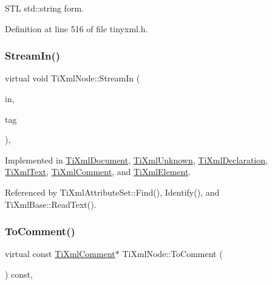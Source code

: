 S\+TL std\+::string form. 



Definition at line 516 of file tinyxml.\+h.

\hypertarget{class_ti_xml_node_ab4b4af1a6b486dcbc0e327cf291270af}{}\label{class_ti_xml_node_ab4b4af1a6b486dcbc0e327cf291270af} 
\subsubsection{\texorpdfstring{Stream\+In()}{StreamIn()}}
{\footnotesize\ttfamily virtual void Ti\+Xml\+Node\+::\+Stream\+In (\begin{DoxyParamCaption}\item[{std\+::istream $\ast$}]{in,  }\item[{\hyperlink{tinyxml_8h_a92bada05fd84d9a0c9a5bbe53de26887}{T\+I\+X\+M\+L\+\_\+\+S\+T\+R\+I\+NG} $\ast$}]{tag }\end{DoxyParamCaption})\hspace{0.3cm}{\ttfamily [protected]}, {}}



Implemented in \hyperlink{class_ti_xml_document_ab6d70b2c19e46aedb9903b3c3aa2a568}{Ti\+Xml\+Document}, \hyperlink{class_ti_xml_unknown_ad3f8fcc1efe364ddd8f43ef9a1046300}{Ti\+Xml\+Unknown}, \hyperlink{class_ti_xml_declaration_a72e455200e6b6e265e76bdec4417bb73}{Ti\+Xml\+Declaration}, \hyperlink{class_ti_xml_text_ab0ad9f14fd41689ced26f21a5c8919b4}{Ti\+Xml\+Text}, \hyperlink{class_ti_xml_comment_ad69c1024082f716462b6fd4b94488320}{Ti\+Xml\+Comment}, and \hyperlink{class_ti_xml_element_acc42052299e0bcf04871f3c2d229fe93}{Ti\+Xml\+Element}.



Referenced by Ti\+Xml\+Attribute\+Set\+::\+Find(), Identify(), and Ti\+Xml\+Base\+::\+Read\+Text().

\hypertarget{class_ti_xml_node_a5ad43b9d545315e9bb4f50d4cb70de9e}{}\label{class_ti_xml_node_a5ad43b9d545315e9bb4f50d4cb70de9e} 
\subsubsection{\texorpdfstring{To\+Comment()}{ToComment()}\hspace{0.1cm}{\footnotesize\ttfamily [1/2]}}
{\footnotesize\ttfamily virtual const \hyperlink{class_ti_xml_comment}{Ti\+Xml\+Comment}$\ast$ Ti\+Xml\+Node\+::\+To\+Comment (\begin{DoxyParamCaption}{ }\end{DoxyParamCaption}) const\hspace{0.3cm}{\ttfamily [inline]}, {\ttfamily [virtual]}}




